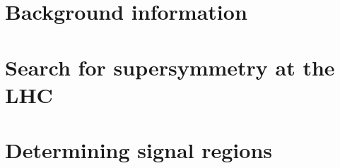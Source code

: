 \documentclass[reqno,12pt,oneside]{report} %
\theoremstyle{plain}
\theoremstyle{definition}
\theoremstyle{remark}
\numberwithin{theorem}{chapter}     %
\begin{document}
 \chapter{Background information}
 \label{chap:bg}
 
 
 \chapter{Search for supersymmetry at the LHC}
 \label{chap:searches}


 \chapter{Determining signal regions}
 \label{chap:results}
 


\startappendices
{}
\label{app:triggers}


 
 \begin{singlespace} %
 \end{singlespace}

%
\end{document}
